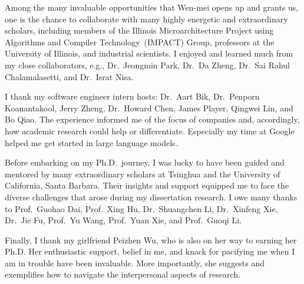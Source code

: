 \begin{acknowledgments}
Among the many invaluable opportunities that Wen-mei opens up and grants us, one is the chance to collaborate with many highly energetic and extraordinary scholars, including members of the Illinois Microarchitecture Project using Algorithms and Compiler Technology~(IMPACT) Group, professors at the University of Illinois, and industrial scientists.
I enjoyed and learned much from my close collaborators, e.g., Dr.\ Jeongmin Park, Dr.\ Da Zheng, Dr.\ Sai Rahul Chalamalasetti, and Dr.\ Israt Nisa.


I thank my software engineer intern hosts: Dr.\ Aart Bik, Dr.\ Penporn Koanantakool, Jerry Zheng, Dr.\ Howard Chen, James Player, Qingwei Lin, and Bo Qiao. The experience informed me of the focus of companies and, accordingly, how academic research could help or differentiate. Especially my time at Google helped me get started in large language models.

Before embarking on my Ph.D.\ journey, I was lucky to have been guided and mentored by many extraordinary scholars at Tsinghua and the University of California, Santa Barbara. Their insights and support equipped me to face the diverse challenges that arose during my dissertation research. I owe many thanks to Prof.\ Guohao Dai, Prof.\ Xing Hu, Dr.\ Shuangchen Li, Dr.\ Xinfeng Xie, Dr.\ Jie Fu, Prof.\ Yu Wang, Prof.\ Yuan Xie, and Prof.\ Guoqi Li.

Finally, I thank my girlfriend Peizhen Wu, who is also on her way to earning her Ph.D. Her enthusiastic support, belief in me, and knack for pacifying me when I am in trouble have been invaluable. More importantly, she suggests and exemplifies how to navigate the interpersonal aspects of research. 

\end{acknowledgments}
